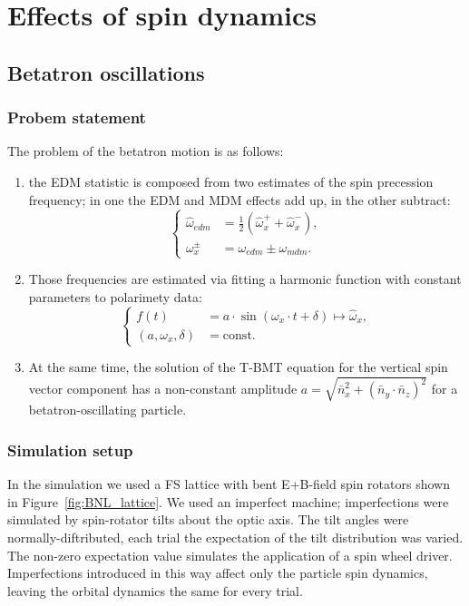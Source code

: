 \documentclass[]{elsarticle}
\newcommand{\w}{\omega}
\newcommand{\nbar}{\bar n}
\newcommand{\const}{\mathrm{const}}
\begin{document}
\section{Effects of spin dynamics}
\subsection{Betatron oscillations}

\subsubsection{Probem statement}
The problem of the betatron motion is as follows:
\begin{enumerate}
\item the EDM statistic is composed from two estimates of the spin precession frequency;
  in one the EDM and MDM effects add up, in the other subtract:
  \begin{equation*}
    \begin{cases}
      \hat\w_{edm} &= \frac12(\hat\w_x^+ + \hat\w_x^-),\\
      \w_x^\pm &= \w_{edm} \pm \w_{mdm}.
    \end{cases}
  \end{equation*}
\item Those frequencies are estimated via fitting a harmonic function with constant parameters to
  polarimety data:
  \begin{equation*}
    \begin{cases}
      f(t) &= a\cdot\sin(\w_x\cdot t + \delta)\mapsto \hat\w_x,\\
      (a,\w_x,\delta) &= \const.
    \end{cases}
  \end{equation*}
\item At the same time, the solution of the T-BMT equation for the vertical spin vector component
  has a non-constant amplitude $a = \sqrt{\nbar_x^2 + (\nbar_y\cdot\nbar_z)^2}$
  for a betatron-oscillating particle.
\end{enumerate}

\subsubsection{Simulation setup}\label{sec:betatron:simulation}
In the simulation we used a FS lattice with bent E+B-field spin rotators
shown in Figure~\ref{fig:BNL_lattice}.
We used an imperfect machine; imperfections were simulated by spin-rotator tilts about the optic axis.
The tilt angles were normally-diftributed, each trial the expectation of the tilt distribution was varied.
The non-zero expectation value simulates the application of a spin wheel driver.
Imperfections introduced in this way affect only the particle spin dynamics,
leaving the orbital dynamics the same for every trial.
\end{document}

